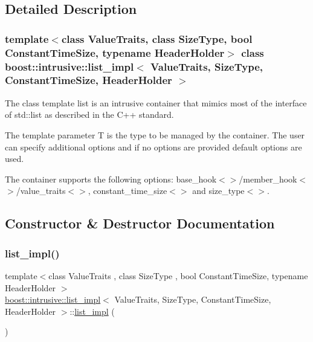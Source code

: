 \subsection{Detailed Description}
\subsubsection*{template$<$class Value\+Traits, class Size\+Type, bool Constant\+Time\+Size, typename Header\+Holder$>$\newline
class boost\+::intrusive\+::list\+\_\+impl$<$ Value\+Traits, Size\+Type, Constant\+Time\+Size, Header\+Holder $>$}

The class template list is an intrusive container that mimics most of the interface of std\+::list as described in the C++ standard.

The template parameter {\ttfamily T} is the type to be managed by the container. The user can specify additional options and if no options are provided default options are used.

The container supports the following options\+: {\ttfamily base\+\_\+hook$<$$>$/member\+\_\+hook$<$$>$/value\+\_\+traits$<$$>$}, {\ttfamily constant\+\_\+time\+\_\+size$<$$>$} and {\ttfamily size\+\_\+type$<$$>$}. 

\subsection{Constructor \& Destructor Documentation}
\mbox{\label{classboost_1_1intrusive_1_1list__impl_a4700da87f6258203c4450d637eef77b3}} 
\subsubsection{\texorpdfstring{list\+\_\+impl()}{list\_impl()}\hspace{0.1cm}{\footnotesize\ttfamily [1/4]}}
{\footnotesize\ttfamily template$<$class Value\+Traits , class Size\+Type , bool Constant\+Time\+Size, typename Header\+Holder $>$ \\
\hyperlink{classboost_1_1intrusive_1_1list__impl}{boost\+::intrusive\+::list\+\_\+impl}$<$ Value\+Traits, Size\+Type, Constant\+Time\+Size, Header\+Holder $>$\+::\hyperlink{classboost_1_1intrusive_1_1list__impl}{list\+\_\+impl} (\begin{DoxyParamCaption}{ }\end{DoxyParamCaption})\hspace{0.3cm}{\ttfamily [inline]}}

